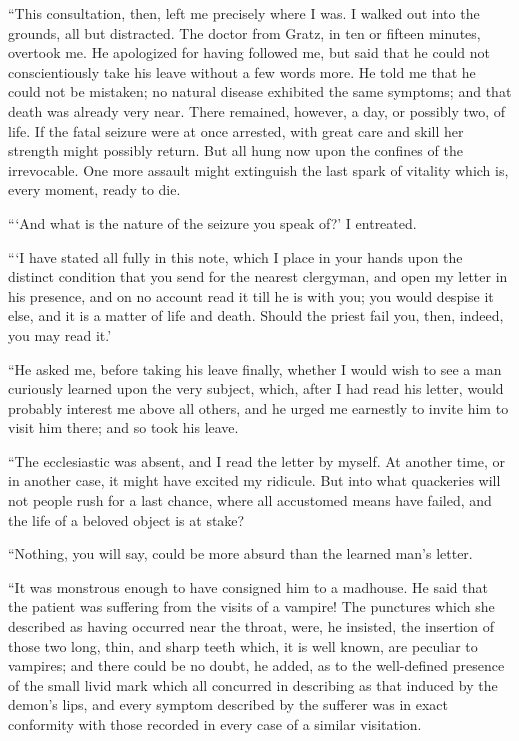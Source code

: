 \documentclass[11pt,twoside,makeidx,hidelinks,]{memoir}
\begin{document}
``This consultation, then, left me precisely where I was. I walked out
into the grounds, all but distracted. The doctor from Gratz, in ten or
fifteen minutes, overtook me. He apologized for having followed me, but
said that he could not conscientiously take his leave without a few
words more. He told me that he could not be mistaken; no natural disease
exhibited the same symptoms; and that death was already very near. There
remained, however, a day, or possibly two, of life. If the fatal seizure
were at once arrested, with great care and skill her strength might
possibly return. But all hung now upon the confines of the irrevocable.
One more assault might extinguish the last spark of vitality which is,
every moment, ready to die.

``{}`And what is the nature of the seizure you speak of?' I entreated.

``{}`I have stated all fully in this note, which I place in your hands upon
the distinct condition that you send for the nearest clergyman, and open
my letter in his presence, and on no account read it till he is with
you; you would despise it else, and it is a matter of life and death.
Should the priest fail you, then, indeed, you may read it.'

``He asked me, before taking his leave finally, whether I would wish to
see a man curiously learned upon the very subject, which, after I had
read his letter, would probably interest me above all others, and he
urged me earnestly to invite him to visit him there; and so took
his leave.

``The ecclesiastic was absent, and I read the letter by myself. At
another time, or in another case, it might have excited my ridicule. But
into what quackeries will not people rush for a last chance, where all
accustomed means have failed, and the life of a beloved object is
at stake?

``Nothing, you will say, could be more absurd than the learned man's
letter.

``It was monstrous enough to have consigned him to a madhouse. He said
that the patient was suffering from the visits of a vampire! The
punctures which she described as having occurred near the throat, were,
he insisted, the insertion of those two long, thin, and sharp teeth
which, it is well known, are peculiar to vampires; and there could be no
doubt, he added, as to the well-defined presence of the small livid mark
which all concurred in describing as that induced by the demon's lips,
and every symptom described by the sufferer was in exact conformity with
those recorded in every case of a similar visitation.
\end{document}
